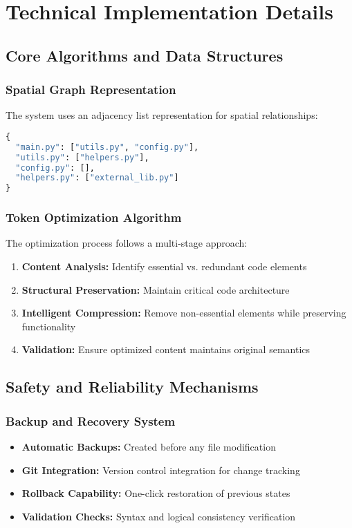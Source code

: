\documentclass[12pt,a4paper]{article}
\begin{document}
\section{Technical Implementation Details}

\subsection{Core Algorithms and Data Structures}

\subsubsection{Spatial Graph Representation}
The system uses an adjacency list representation for spatial relationships:
\begin{lstlisting}[language=Python, caption=Spatial Graph Structure]
{
  "main.py": ["utils.py", "config.py"],
  "utils.py": ["helpers.py"],
  "config.py": [],
  "helpers.py": ["external_lib.py"]
}
\end{lstlisting}

\subsubsection{Token Optimization Algorithm}
The optimization process follows a multi-stage approach:
\begin{enumerate}
    \item \textbf{Content Analysis:} Identify essential vs. redundant code elements
    \item \textbf{Structural Preservation:} Maintain critical code architecture
    \item \textbf{Intelligent Compression:} Remove non-essential elements while preserving functionality
    \item \textbf{Validation:} Ensure optimized content maintains original semantics
\end{enumerate}

\subsection{Safety and Reliability Mechanisms}

\subsubsection{Backup and Recovery System}
\begin{itemize}
    \item \textbf{Automatic Backups:} Created before any file modification
    \item \textbf{Git Integration:} Version control integration for change tracking
    \item \textbf{Rollback Capability:} One-click restoration of previous states
    \item \textbf{Validation Checks:} Syntax and logical consistency verification
\end{itemize}
\end{document}
